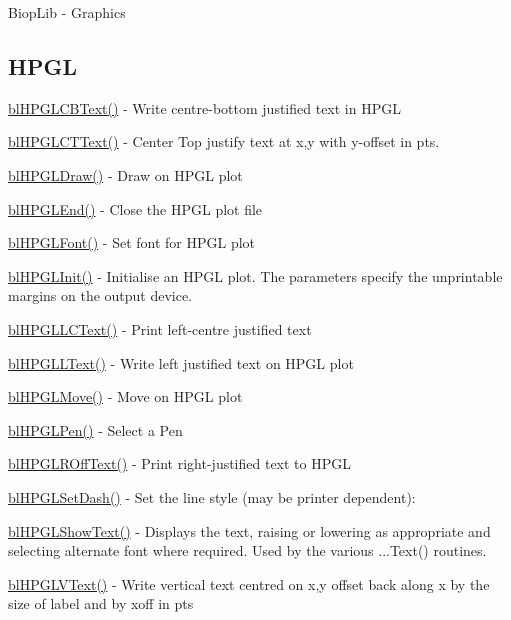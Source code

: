 Biop\-Lib -\/ Graphics

\subsection*{H\-P\-G\-L }


\begin{DoxyItemize}
\item \hyperlink{hpgl_8c_ae886d9e073bd3b8ecb8c59672b23099f}{bl\-H\-P\-G\-L\-C\-B\-Text()} -\/ Write centre-\/bottom justified text in H\-P\-G\-L
\item \hyperlink{hpgl_8c_a4bb376309f3f9d49322364ac78f002d8}{bl\-H\-P\-G\-L\-C\-T\-Text()} -\/ Center Top justify text at x,y with y-\/offset in pts.
\item \hyperlink{hpgl_8c_a2d313965c53e91b778a56c63cb0e14e1}{bl\-H\-P\-G\-L\-Draw()} -\/ Draw on H\-P\-G\-L plot
\item \hyperlink{hpgl_8c_a1ee57be1db63b05fc5e14295305f97a4}{bl\-H\-P\-G\-L\-End()} -\/ Close the H\-P\-G\-L plot file
\item \hyperlink{hpgl_8c_a070b3ec317aad4cd6bb323831af760fa}{bl\-H\-P\-G\-L\-Font()} -\/ Set font for H\-P\-G\-L plot
\item \hyperlink{hpgl_8c_a4898f2d666137da6060ec24dafcc37ac}{bl\-H\-P\-G\-L\-Init()} -\/ Initialise an H\-P\-G\-L plot. The parameters specify the unprintable margins on the output device.
\item \hyperlink{hpgl_8c_a5ec2d9d164e180cca358086752e6e710}{bl\-H\-P\-G\-L\-L\-C\-Text()} -\/ Print left-\/centre justified text
\item \hyperlink{hpgl_8c_a75caa4a93caf0f9fae0d4cc621fe292f}{bl\-H\-P\-G\-L\-L\-Text()} -\/ Write left justified text on H\-P\-G\-L plot
\item \hyperlink{hpgl_8c_aa2dab0cb46001a4e691d18653661252b}{bl\-H\-P\-G\-L\-Move()} -\/ Move on H\-P\-G\-L plot
\item \hyperlink{hpgl_8c_ae634f9a420b0bc53593539ff8a07a95a}{bl\-H\-P\-G\-L\-Pen()} -\/ Select a Pen
\item \hyperlink{hpgl_8c_a5361120c9b1cc0eaa71a35feeea063ae}{bl\-H\-P\-G\-L\-R\-Off\-Text()} -\/ Print right-\/justified text to H\-P\-G\-L
\item \hyperlink{hpgl_8c_ace61dbc87fdbbc3bd61a4d9e28143d65}{bl\-H\-P\-G\-L\-Set\-Dash()} -\/ Set the line style (may be printer dependent)\-:
\item \hyperlink{hpgl_8c_a0f240ad996dec6dc323f1f86e187f671}{bl\-H\-P\-G\-L\-Show\-Text()} -\/ Displays the text, raising or lowering as appropriate and selecting alternate font where required. Used by the various ...Text() routines.
\item \hyperlink{hpgl_8c_ae4e171552ee152d0fe3b4fe854839810}{bl\-H\-P\-G\-L\-V\-Text()} -\/ Write vertical text centred on x,y offset back along x by the size of label and by xoff in pts
\end{DoxyItemize}

